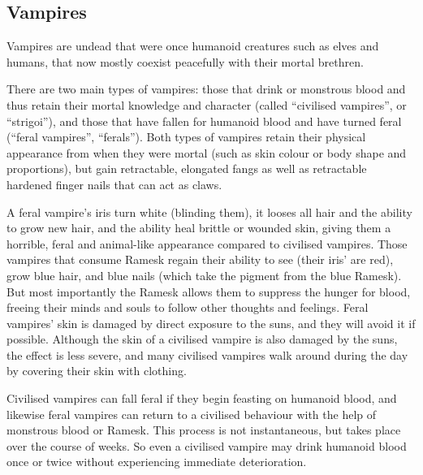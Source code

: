 \clearpage
{}
\clearpage

\subsection{Vampires}
\label{sec:Vampires}

Vampires are undead that were once humanoid creatures such as elves and
humans, that now mostly coexist peacefully with their mortal brethren.

There are two main types of vampires: those that drink  or
monstrous blood and thus retain their mortal knowledge and character (called
``civilised vampires'', or ``strigoi''), and those that have fallen for
humanoid blood and have turned feral (``feral vampires'', ``ferals''). Both
types of vampires retain their physical appearance from when they were mortal
(such as skin colour or body shape and proportions), but gain retractable,
elongated fangs as well as retractable hardened finger nails that can act as
claws.

A feral vampire's iris turn white (blinding them), it looses all hair and the
ability to grow new hair, and the ability heal brittle or wounded skin, giving
them a horrible, feral and animal-like appearance compared to civilised
vampires. Those vampires that consume Ramesk regain their ability to see
(their iris' are red), grow blue hair, and blue nails (which take the pigment
from the blue Ramesk). But most importantly the Ramesk allows them to suppress
the hunger for blood, freeing their minds and souls to follow other thoughts
and feelings. Feral vampires' skin is damaged by direct exposure to the
suns, and they will avoid it if possible. Although the skin of a civilised
vampire is also damaged by the suns, the effect is less severe, and many
civilised vampires walk around during the day by covering their skin with
clothing.

Civilised vampires can fall feral if they begin feasting on humanoid blood,
and likewise feral vampires can return to a civilised behaviour with the help
of monstrous blood or Ramesk. This process is not instantaneous, but takes
place over the course of weeks. So even a civilised vampire may drink humanoid
blood once or twice without experiencing immediate deterioration.

